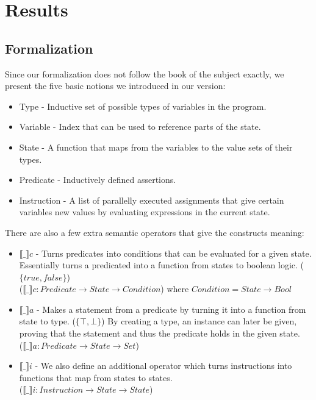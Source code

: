\chapter{Results}

\section{Formalization}

Since our formalization does not follow the book of the subject exactly, we present the five basic notions we introduced in our version:
\begin{itemize}
    \item Type - Inductive set of possible types of variables in the program.
    \item Variable - Index that can be used to reference parts of the state.
    \item State - A function that maps from the variables to the value sets of their types.
    \item Predicate - Inductively defined assertions.
    \item Instruction - A list of parallelly executed assignments that give certain variables new values by evaluating expressions in the current state.
\end{itemize}

\newcommand{\sem}[2]{\llbracket #1 \rrbracket #2}

There are also a few extra semantic operators that give the constructs meaning:
\begin{itemize}
    \item $\sem{\_}{c}$ - Turns predicates into conditions that can be evaluated for a given state. Essentially turns a predicated into a function from states to boolean logic. ($\{true , false\}$) \\
    ($\sem{\_}{c} : Predicate \to State \to Condition$) where $Condition = State \to Bool$

    \item $\sem{\_}{a}$ - Makes a statement from a predicate by turning it into a function from state to type. ($\{\top , \bot\}$) By creating a type, an instance can later be given, proving that the statement and thus the predicate holds in the given state. \\
    ($\sem{\_}{a} : Predicate \to State \to Set$)

    \item $\sem{\_}{i}$ - We also define an additional operator which turns instructions into functions that map from states to states. \\ ($\sem{\_}{i} : Instruction \to State \to State$)
\end{itemize}

